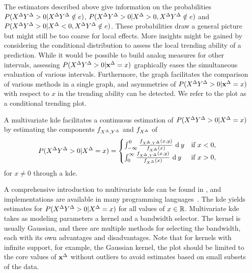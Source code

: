 The estimators described above give information on the probabilities $P(X^{\Delta} Y^{\Delta} > 0 | X^{\Delta} Y^{\Delta} \notin e)$, $P(X^{\Delta} Y^{\Delta} > 0 | X^{\Delta} > 0, X^{\Delta} Y^{\Delta} \notin e)$ and $P(X^{\Delta} Y^{\Delta} > 0 | X^{\Delta} < 0, X^{\Delta} Y^{\Delta} \notin e)$.
These probabilities draw a general picture but might still be too coarse for local effects.
More insights might be gained by considering the conditional distribution to assess the local trending ability of a prediction.
While it would be possible to build analog measures for other intervals, assessing $P(X^{\Delta} Y^{\Delta} > 0 | \mathbf{x}^{\Delta} = x)$ graphically eases the simultaneous evaluation of various intervals.
Furthermore, the graph facilitates the comparison of various methods in a single graph, and asymmetries of $P(X^{\Delta} Y^{\Delta} > 0 | \mathbf{x}^{\Delta} = x)$ with respect to $x$ in the trending ability can be detected.
We refer to the plot as a conditional trending plot.

A multivariate \acf{kde} facilitates a continuous estimation of $P(X^{\Delta} Y^{\Delta} > 0 | X^{\Delta} = x)$ by estimating the components $f_{X^{\Delta}, Y^{\Delta}}$ and $f_{X^{\Delta}}$ of
\begin{align*}
P(X^{\Delta} Y^{\Delta} > 0 | X^{\Delta} = x) = \begin{cases}
                                              \int_{-\infty}^0 \frac{f_{X^{\Delta}, Y^{\Delta}}(x, y)}{f_{X^{\Delta}}(x)} \ \textrm{d} \: y & \text{if } x < 0, \\
                                              \int_{0}^{\infty} \frac{f_{X^{\Delta}, Y^{\Delta}}(x, y)}{f_{X^{\Delta}}(x)} \ \textrm{d} \: y & \text{if } x > 0, \\
\end{cases}
\end{align*}
for $x \neq 0$ through a \ac{kde}.

A comprehensive introduction to multivariate \ac{kde} can be found in \textcite{Gramacki2018}, and implementations are available in many programming languages~\parencite[e.g., for  Python in][]{Seabold2010}.
The \ac{kde} yields estimates for $P(X^{\Delta} Y^{\Delta} > 0 | X^{\Delta} = x)$ for all values of $x \in \mathbb{R}$.
Multivariate \ac{kde} takes as modeling parameters a kernel and a bandwidth selector. 
The kernel is usually Gaussian, and there are multiple methods for selecting the bandwidth, each with its own advantages and disadvantages.
Note that for kernels with infinite support, for example, the Gaussian kernel, the plot should be limited to the core values of $\mathbf{x}^{\Delta}$ without outliers to avoid estimates based on small subsets of the data.

